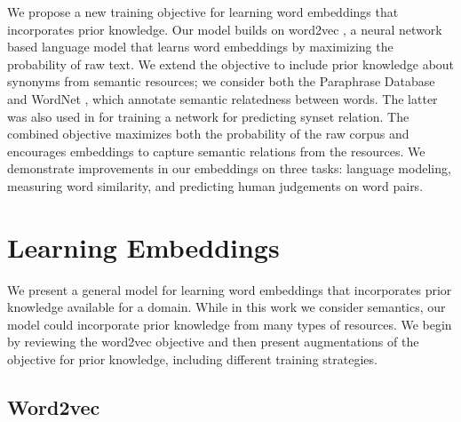 \documentclass[11pt]{article}
\begin{document}
We propose a new training objective for learning word embeddings that incorporates prior knowledge.
Our model builds on word2vec %
\cite{mikolov2013distributed},
a neural network based language model that learns word
embeddings by maximizing the probability of raw text.
We extend the objective to include prior knowledge about synonyms from semantic resources;
we consider both the Paraphrase Database \cite{ganitkevitch2013ppdb} and WordNet \cite{fellbaum1999wordnet},
which annotate semantic relatedness between words. 
The latter was also used in \cite{bordes2012joint} for training a network for predicting synset relation.
The combined objective maximizes both the probability of the raw corpus 
and encourages embeddings to capture semantic relations from the resources.
We demonstrate improvements in our embeddings
on three tasks: language modeling, measuring word similarity, and predicting human judgements 
on word pairs.

\vspace{-.1cm}
\section{Learning Embeddings}
\label{sec:train}
\vspace{-.1cm}
We present a general model for learning word embeddings that incorporates prior
knowledge available for a domain. While in this work we consider semantics, our model
could incorporate prior knowledge from many types of resources.
We begin by reviewing the word2vec objective and then present
augmentations of the objective for prior knowledge, including different training strategies.

\subsection{Word2vec}
\end{document}
